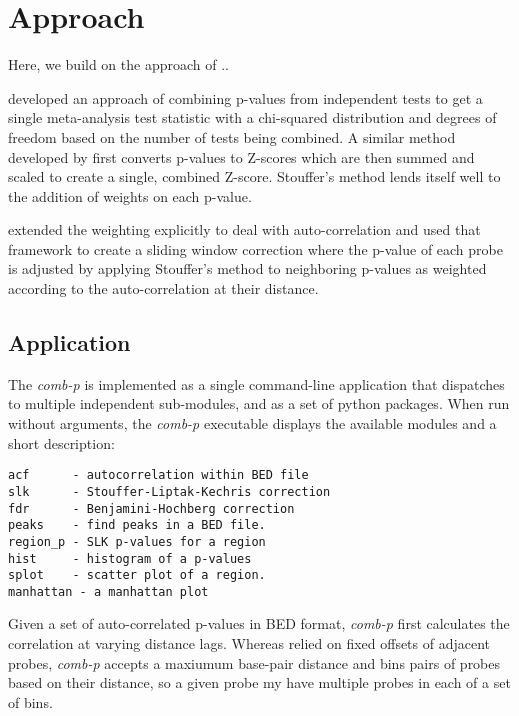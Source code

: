 \documentclass{bioinfo}
\begin{document}
\section{Approach}
Here, we build on the approach of \citep{Kechris2010}..

\citep{Fisher} developed an approach of combining p-values from independent tests
to get a single meta-analysis test statistic with a chi-squared distribution 
and degrees of freedom based on the number of tests being combined.
A similar method developed by \citep{Stouffer} first converts p-values
to Z-scores which are then summed and scaled to create a single, combined Z-score.
Stouffer's method lends itself well to the addition of weights on each p-value.

\citep{Zaykin} extended the weighting explicitly to deal with auto-correlation and
\citep{Kechris2010} used that framework to create a sliding window correction where
the p-value of each probe is adjusted by applying Stouffer's method to neighboring
p-values as weighted according to the auto-correlation at their distance.


\begin{methods}
\section{Application}
The \textit{comb-p} is implemented as a single command-line application that dispatches to multiple independent sub-modules, and as a set of python packages. When run without arguments, the \textit{comb-p} executable displays the available modules and a short description:
\begin{verbatim}
acf      - autocorrelation within BED file
slk      - Stouffer-Liptak-Kechris correction
fdr      - Benjamini-Hochberg correction
peaks    - find peaks in a BED file.
region_p - SLK p-values for a region
hist     - histogram of a p-values
splot    - scatter plot of a region.
manhattan - a manhattan plot
\end{verbatim}

Given a set of auto-correlated p-values in BED format, \textit{comb-p} first
calculates the correlation at varying distance lags. Whereas \citep{Kechris2010}
relied on fixed offsets of adjacent probes, \textit{comb-p} accepts
a maxiumum base-pair distance and bins pairs of probes based on their
distance, so a given probe my have multiple probes in each of a set of bins.

\end{methods}
\end{document}

